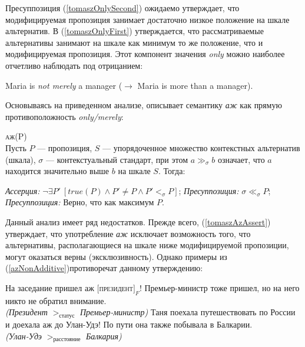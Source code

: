 \documentclass[a4paper, titlepage, 12pt]{article}
\begin{document}
Пресуппозиция (\ref{tomaszOnlySecond}) ожидаемо утверждает, что модифицируемая пропозиция занимает достаточно низкое положение на шкале альтернатив.  В (\ref{tomaszOnlyFirst}) утверждается, что рассматриваемые альтернативы занимают на шкале как минимум то же положение, что и модифицируемая пропозиция. Этот компонент значения \textit{only} можно наиболее отчетливо наблюдать под отрицанием:

\begin{exe}
    \ex Maria is \textit{not merely} a manager ($ \rightarrow $ Maria is more than a manager).
\end{exe}

Основываясь на приведенном анализе, \citep{tomaszevicz2011az} описывает семантику \textit{аж} как прямую противоположность \textit{only/merely}:

\begin{exe}
    \ex \textsc{аж(P)} \\ {\footnotesize Пусть $ P $ --- пропозиция, $ S $ --- упорядоченное множество контекстных альтернатив (шкала), $ \sigma $ --- контекстуальный стандарт, при  этом $ a \gg_{\sigma} b $ означает, что $ a $ находится значительно выше $ b $ на шкале $ S $. Тогда:} \begin{xlist}
        \ex \label{tomaszAzAssert} \textit{Ассерция:} $ \lnot \exists P'\ [ true(P) \land P' \neq P \land P' <_{\sigma} P] $;
        \ex \textit{Пресуппозиция:} $ \sigma \ll_{\sigma} P $;
        \ex \textit{Пресуппозиция:} Верно, что как максимум $ P $.
    \end{xlist}
\end{exe}

Данный анализ имеет ряд недостатков. Прежде всего, (\ref{tomaszAzAssert}) утверждает, что употребление \textit{аж} исключает возможность того, что альтернативы, располагающиеся на шкале ниже модифицируемой пропозиции, могут оказаться верны (эксклюзивность). Однако примеры из (\ref{azNonAdditive})противоречат данному утверждению:

 \begin{exe}
    \ex \label{azNonAdditive} \begin{xlist}
        \ex На заседание пришел аж $ [ $\textsc{президент}$ ]_F $! Премьер-министр тоже пришел, но на него никто не обратил внимание. \\
            \textit{(Президент} $ >_{\text{статус}} $ \textit{Премьер-министр)}
        \ex Таня поехала путешествовать по России и доехала аж до Улан-Удэ! По пути она также побывала в Балкарии. \\
        \textit{(Улан-Удэ} $ >_{\text{расстояние}} $ \textit{Балкария)}
    \end{xlist}
\end{exe}
\end{document}

